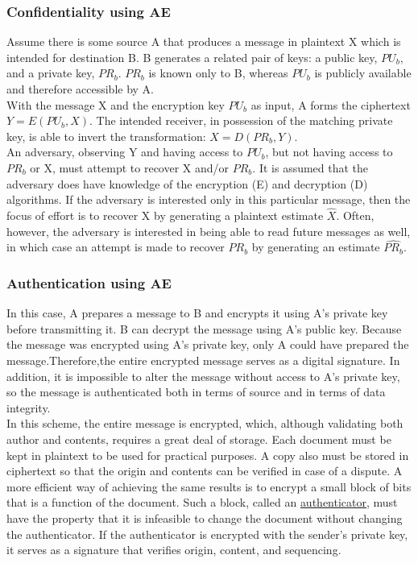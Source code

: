 \documentclass[12pt]{article}
\begin{document}
 \subsubsection{Confidentiality using AE}
 Assume there is some source A that produces a message in plaintext X which is intended for destination B. B generates a related pair of keys: a public key, $PU_b$, and a private key, $PR_b$. $PR_b$ is known only to B, whereas $PU_b$ is publicly available and therefore accessible by A.\\ With the message X and the encryption key $PU_b$ as input, A forms the ciphertext $Y = E(PU_b, X)$. The intended receiver, in possession of the matching private key, is able to invert the transformation: $X = D(PR_b,Y)$.\\ 
 An adversary, observing Y and having access to $PU_b$, but not having access to $PR_b$ or X, must attempt to recover X and/or $PR_b$. It is assumed that the adversary does have knowledge  of  the  encryption  (E)  and decryption  (D) algorithms.  If  the adversary is interested only in this particular message, then the focus of effort is to recover X by generating a plaintext estimate $\widehat{X}$. Often, however, the adversary is interested in being able to read future messages as well, in which case an attempt is made to recover $PR_b$ by generating an estimate $\widehat{PR_b}$.
 
 \subsubsection{Authentication using AE}
 In this case, A prepares a message to B and encrypts it using A’s private key before transmitting it. B can decrypt the message using A’s public key. Because the message was encrypted using A’s private key, only A could have prepared the message.Therefore,the entire encrypted message serves as a digital signature. In addition, it is impossible to alter the message without access to A’s private key, so the message is authenticated both in terms of source and in terms of data integrity.\\
 In this scheme, the entire message is encrypted, which, although validating both author and contents, requires a great deal of storage. Each document must be kept in plaintext to be used for practical purposes. A copy also must be stored in ciphertext so that the origin and contents can be verified in case of a dispute. A more efficient way of achieving the same results is to encrypt a small block of bits that is a function of the document. Such a block, called an \underline{authenticator}, must have the property that it is infeasible to change the document without changing the authenticator. If the authenticator is encrypted with the sender’s private key, it serves as a signature that verifies origin, content, and sequencing.
 
\end{document}
